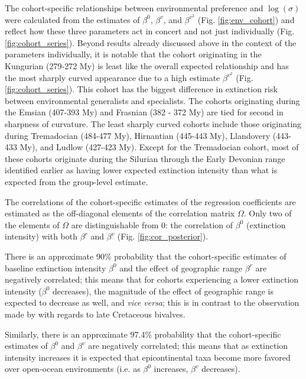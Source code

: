 \documentclass{article}
\begin{document}
The cohort-specific relationships between environmental preference and \(\log(\sigma)\) were calculated from the estimates of \(\beta^{0}\), \(\beta^{v}\), and \(\beta^{v^{2}}\) (Fig. \ref{fig:env_cohort}) and reflect how these three parameters act in concert and not just individually (Fig. \ref{fig:cohort_series}). Beyond results already discussed above in the context of the parameters individually, it is notable that the cohort originating in the Kungurian (279-272 My) is least like the overall expected relationship and has the most sharply curved appearance due to a high estimate \(\beta^{v^{2}}\) (Fig. \ref{fig:cohort_series}). This cohort has the biggest difference in extinction risk between environmental generalists and specialists. The cohorts originating during the Emsian (407-393 My) and Frasnian (382 - 372 My) are tied for second in sharpness of curvature. The least sharply curved cohorts include those originating during Tremadocian (484-477 My), Hirnantian (445-443 My), Llandovery (443-433 My), and Ludlow (427-423 My). Except for the Tremadocian cohort, most of these cohorts originate during the Silurian through the Early Devonian range identified earlier as having lower expected extinction intensity than what is expected from the group-level estimate.

The correlations of the cohort-specific estimates of the regression coefficients are estimated as the off-diagonal elements of the correlation matrix \(\Omega\). Only two of the elements of \(\Omega\) are distinguishable from 0: the correlation of \(\beta^{0}\) (extinction intensity) with both \(\beta^{r}\) and \(\beta^{v}\) (Fig. \ref{fig:cor_posterior}). 

There is an approximate 90\% probability that the cohort-specific estimates of baseline extinction intensity \(\beta^{0}\) and the effect of geographic range \(\beta^{r}\) are negatively correlated; this means that for cohorts experiencing a lower extinction intensity (\(\beta^{0}\) decreases), the magnitude of the effect of geographic range is expected to decrease as well, and \textit{vice versa}; this is in contrast to the observation made by \citet{Jablonski1986} with regards to late Cretaceous bivalves.

Similarly, there is an approximate 97.4\% probability that the cohort-specific estimates of \(\beta^{0}\) and \(\beta^{v}\) are negatively correlated; this means that as extinction intensity increases it is expected that epicontinental taxa become more favored over open-ocean environments (i.e. as \(\beta^{0}\) increases, \(\beta^{v}\) decreases). 
\end{document}

